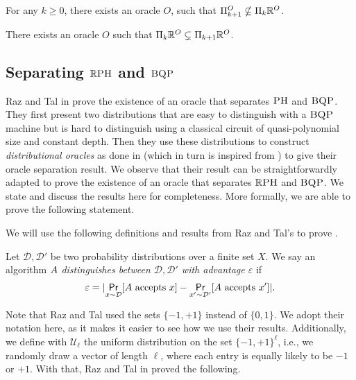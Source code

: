 \documentclass{article}
\begin{document}
\begin{corollary}
        For any $k\geq 0$,
        there exists an oracle $O$, such that  $\Pi_{k+1}^{O} \nsubseteq \Pi_{k}\mathbb{R}^O$. 
\end{corollary}

\begin{corollary}
    There exists an oracle $O$ such that $\Pi_{k}\mathbb{R}^O \subsetneq \Pi_{k+1}\mathbb{R}^O$.
\end{corollary}

\subsection{Separating $\mathbb{R}\textsc{PH}$ and $\textsc{BQP}$}
Raz and Tal in \cite{RT22} prove the existence of an oracle that separates $\textsc{PH}$ and $\textsc{BQP}$. They first present two distributions that are easy to distinguish with a $\textsc{BQP}$ machine but is hard to distinguish using a classical circuit of quasi-polynomial size and constant depth. Then they use these distributions to construct \emph{distributional oracles} as done in \cite[Section~2.6]{FSUV13} (which in turn is inspired from \cite{Aaronson2010}) to give their oracle separation result. We observe that their result can be straightforwardly adapted to prove the existence of an oracle that separates $\mathbb{R}\textsc{PH}$ and $\textsc{BQP}$. We state and discuss the results here for completeness. More formally, we are able to prove the following statement.

\BQPnotinRPH*

We will use the following definitions and results from Raz and Tal's \cite{RT22} to prove .
\begin{definition}
\label{def:AlgorithmicAdvantage}
Let $\mathcal{D},\mathcal{D'}$ be two probability distributions over a finite set $X$. 
We say an algorithm $A$ \textit{distinguishes between $\mathcal{D},\mathcal{D'}$ with advantage $\varepsilon$} if
\begin{equation*}
    \varepsilon=|\underset{x \sim \mathcal{D}}{\operatorname*{\textsf{Pr}}}[A \text{ accepts }x] - \underset{x' \sim \mathcal{D'}}{\operatorname*{\textsf{Pr}}}[A \text{ accepts } x']|.
\end{equation*}
\end{definition}

Note that Raz and Tal used the sets $\{-1,+1\}$ instead of $\{0,1\}$. We adopt their notation here, as it makes it easier to see how we use their results. Additionally, we define with $\mathcal{U}_\ell$ the uniform distribution on the set $\{-1,+1\}^{\ell}$, i.e., we randomly draw a vector of length $\ell$, where each entry is equally likely to be $-1$ or $+1$. With that, Raz and Tal in \cite{RT22} proved the following.
\end{document}
